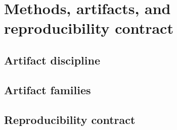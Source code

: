 \section{Methods, artifacts, and reproducibility contract}\label{app:methods}


\subsection{Artifact discipline}\label{subsec:artifact-discipline}


\subsection{Artifact families}\label{subsec:artifact-families}


\subsection{Reproducibility contract}\label{subsec:reproducibility-contract}

